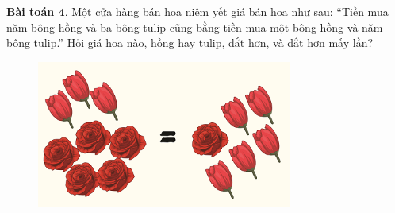 	\textbf{\color{toancuabi}Bài toán $\pmb{4.}$} Một cửa hàng bán hoa niêm yết giá bán hoa như sau:
	\vskip 0.15cm
	“Tiền mua năm bông hồng và ba bông tulip cũng bằng tiền mua một bông hồng và năm bông tulip.”
	\vskip 0.15cm
	Hỏi giá hoa nào, hồng hay tulip, đắt hơn, và đắt hơn mấy lần?
	\begin{figure}[H]
		\centering
		\vspace*{-5pt}
		\captionsetup{labelformat= empty, justification=centering}
		\includegraphics[width=0.75\textwidth]{pic5}
		\vspace*{-5pt}
	\end{figure}